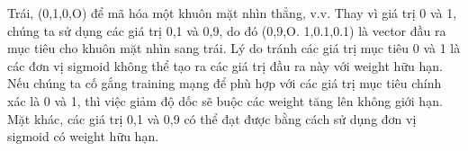 Trái, (0,1,0,O) để mã hóa một khuôn mặt nhìn thẳng, v.v. Thay vì giá trị 0 và 1, chúng ta sử dụng các giá trị 0,1 và 0,9, do đó (0,9,O. 1,0.1,0.1) là vector đầu ra mục tiêu cho khuôn mặt nhìn sang trái. Lý do tránh các giá trị mục tiêu 0 và 1 là các đơn vị sigmoid không thể tạo ra các giá trị đầu ra này với weight hữu hạn. Nếu chúng ta cố gắng training mạng để phù hợp với các giá trị mục tiêu chính xác là 0 và 1, thì việc giảm độ dốc sẽ buộc các weight tăng lên không giới hạn. Mặt khác, các giá trị 0,1 và 0,9 có thể đạt được bằng cách sử dụng đơn vị sigmoid có weight hữu hạn.

